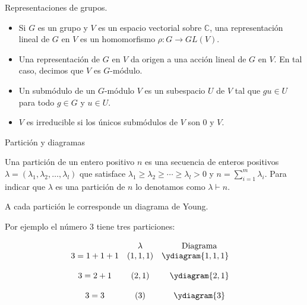 \documentclass[final,xcolor=svgnames]{beamer}
\begin{document}
\begin{frame}{}
  \begin{columns}
    \begin{column}{0.5\textwidth}
      \centering
      \begin{block}{Representaciones de grupos.}
        \begin{itemize}
          \item Si $G$ es un grupo y $V$ es un espacio vectorial sobre
            $\mathbb{C}$, una \alert{representación lineal} de $G$ en
            $V$ es un homomorfismo $\rho\colon G\rightarrow GL(V).$
          \item Una representación de $G$ en $V$ da origen a una
            acción lineal de $G$ en $V$. En tal caso, decimos que $V$ es \alert{$G$-módulo.}  
         \item Un \alert{submódulo} de un $G$-módulo $V$ es un
           subespacio $U$ de $V$ tal que $gu \in U$ para todo $g\in G$ y $u\in U$.
          \item $V$ es \alert{irreducible} si los únicos submódulos de
            $V$ son $0$ y $V$.
        \end{itemize}
      \end{block}

      \begin{block}{Partición y diagramas}
        \begin{minipage}{0.5\linewidth}
          Una \alert{partición} de un entero positivo $n$ es una secuencia de
          enteros positivos
          $\lambda=(\lambda_{1},\lambda_{2},\ldots,\lambda_{l})$ que satisface
          $\lambda_{1}\geq\lambda_{2}\geq\cdots\geq\lambda_{l}>0$ y
          $n=\sum^{m}_{i=1}\lambda_{i}$. Para indicar que  $\lambda$ es una partición de
          $n$ lo denotamos como $\lambda\vdash n$.

          A cada partición le corresponde un \alert{diagrama de Young}.
          
          Por ejemplo el número $3$ tiene tres particiones:

        \end{minipage}
        \begin{minipage}{0.48\linewidth}
          \begin{equation*}
            \begin{array}{cccc}
              & \lambda  &\mbox{Diagrama} \\ %
              3=1+1+1   &  (1,1,1) & \ydiagram{1,1,1} \quad\\ %
              \\ 3=2+1   &   (2,1)  &\ydiagram{2,1} \\ %
              \\ 3=3     &   (3)    &\ydiagram{3} %
            \end{array}
          \end{equation*}
        \end{minipage}
      \end{block}


\end{column}
\end{columns}
\end{frame}
\end{document}
